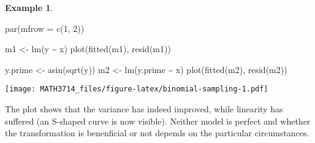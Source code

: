 \documentclass[
  a4paper,
]{article}
\newenvironment{Shaded}{\begin{snugshade}}{\end{snugshade}}
\newcommand{\AttributeTok}[1]{\textcolor[rgb]{0.77,0.63,0.00}{#1}}
\newcommand{\DecValTok}[1]{\textcolor[rgb]{0.00,0.00,0.81}{#1}}
\newcommand{\FunctionTok}[1]{\textcolor[rgb]{0.00,0.00,0.00}{#1}}
\newcommand{\NormalTok}[1]{#1}
\newcommand{\OtherTok}[1]{\textcolor[rgb]{0.56,0.35,0.01}{#1}}
\newcommand{\SpecialCharTok}[1]{\textcolor[rgb]{0.00,0.00,0.00}{#1}}
\theoremstyle{definition}
\theoremstyle{definition}
\newtheorem{example}{Example}[section]
\theoremstyle{definition}
\theoremstyle{definition}
\theoremstyle{remark}
\begin{document}
\begin{example}
\begin{Shaded}
\begin{Highlighting}[]
\FunctionTok{par}\NormalTok{(}\AttributeTok{mfrow =} \FunctionTok{c}\NormalTok{(}\DecValTok{1}\NormalTok{, }\DecValTok{2}\NormalTok{))}

\NormalTok{m1 }\OtherTok{\textless{}{-}} \FunctionTok{lm}\NormalTok{(y }\SpecialCharTok{\textasciitilde{}}\NormalTok{ x)}
\FunctionTok{plot}\NormalTok{(}\FunctionTok{fitted}\NormalTok{(m1), }\FunctionTok{resid}\NormalTok{(m1))}

\NormalTok{y.prime }\OtherTok{\textless{}{-}} \FunctionTok{asin}\NormalTok{(}\FunctionTok{sqrt}\NormalTok{(y))}
\NormalTok{m2 }\OtherTok{\textless{}{-}} \FunctionTok{lm}\NormalTok{(y.prime }\SpecialCharTok{\textasciitilde{}}\NormalTok{ x)}
\FunctionTok{plot}\NormalTok{(}\FunctionTok{fitted}\NormalTok{(m2), }\FunctionTok{resid}\NormalTok{(m2))}
\end{Highlighting}
\end{Shaded}

\texttt{[image: MATH3714\_files/figure-latex/binomial-sampling-1.pdf]}

The plot shows that the variance has indeed improved, while linearity
has suffered (an S-shaped curve is now visible). Neither model is perfect and
whether the transformation
is benenficial or not depends on the particular circumstances.
\end{example}
\end{document}
